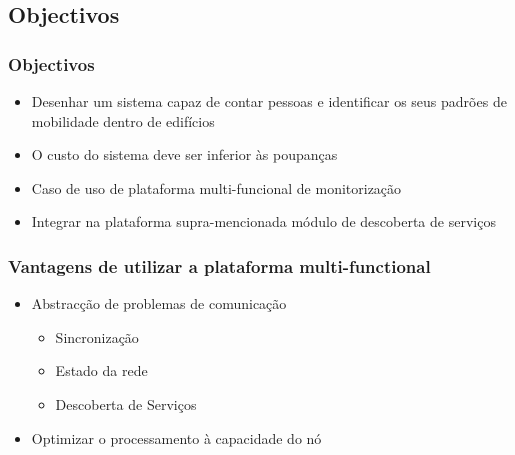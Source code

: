 \documentclass[]{beamer}
\begin{document}
\subsection{Objectivos}

\begin{frame}
  \frametitle{Objectivos}   %

  \begin{itemize}
	\item Desenhar um sistema capaz de contar pessoas e identificar os seus padrões de mobilidade dentro de edifícios
	\item O custo do sistema deve ser inferior às poupanças
	\item Caso de uso de plataforma multi-funcional de monitorização
	\item Integrar na plataforma supra-mencionada módulo de descoberta de serviços
  \end{itemize}
\end{frame}

\begin{frame}
  \frametitle{Vantagens de utilizar a plataforma multi-functional}   %

  \begin{itemize}
	\item Abstracção de problemas de comunicação
	\begin{itemize}
		\item Sincronização
		\item Estado da rede
		\item Descoberta de Serviços
	\end{itemize}

	\item Optimizar o processamento à capacidade do nó
  \end{itemize}
\end{frame}

\end{document}
